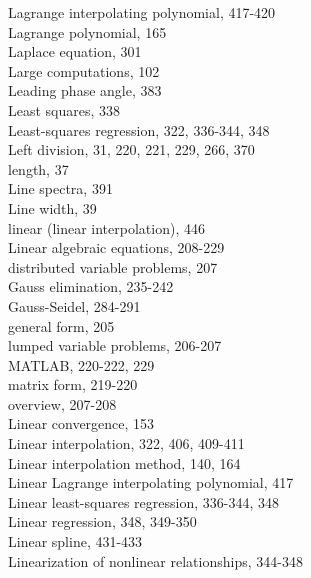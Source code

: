\documentclass[../main.tex]{subfiles}
\begin{document}
\begin{multicols}{3}
    Lagrange interpolating polynomial, 417-420\\
    Lagrange polynomial, 165\\
    Laplace equation, 301\\
    Large computations, 102\\
    Leading phase angle, 383\\
    Least squares, 338\\
    Least-squares regression, 322, 336-344, 348\\
    Left division, 31, 220, 221, 229, 266, 370\\
    length, 37\\
    Line spectra, 391\\
    Line width, 39\\
    linear (linear interpolation), 446\\
    Linear algebraic equations, 208-229\\
    \hspace*{3mm}distributed variable problems, 207\\
    \hspace*{3mm}Gauss elimination, 235-242\\
    \hspace*{3mm}Gauss-Seidel, 284-291\\
    \hspace*{3mm}general form, 205\\
    \hspace*{3mm}lumped variable problems, 206-207\\
    \hspace*{3mm}MATLAB, 220-222, 229\\
    \hspace*{3mm}matrix form, 219-220\\
    \hspace*{3mm}overview, 207-208\\
    Linear convergence, 153\\
    Linear interpolation, 322, 406, 409-411\\
    Linear interpolation method, 140, 164\\
    Linear Lagrange interpolating polynomial, 417\\
    Linear least-squares regression, 336-344, 348\\
    Linear regression, 348, 349-350\\
    Linear spline, 431-433\\
    Linearization of nonlinear relationships, 344-348\\

\end{multicols}
\end{document}
